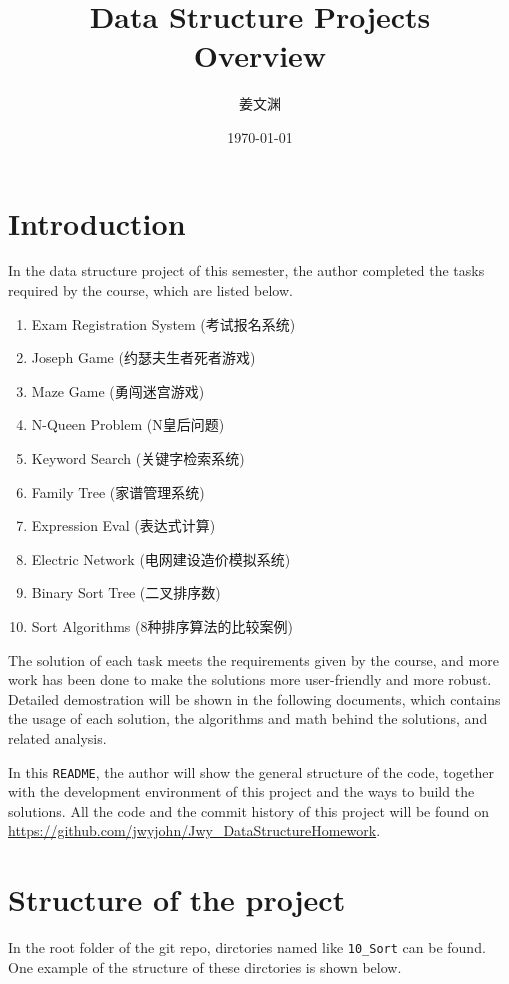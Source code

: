 \documentclass[cn,black,12pt,normal]{elegantnote}
\title{Data Structure Projects\\Overview}
\author{姜文渊}
\institute{School of Software Engineering, Tongji University}
\date{\today}
\begin{document}
\maketitle

\section{Introduction}

In the data structure project of this semester, the author completed the tasks required by the course, which are listed below.

\begin{enumerate}
    \item Exam Registration System (考试报名系统)
    \item Joseph Game (约瑟夫生者死者游戏)
    \item Maze Game (勇闯迷宫游戏)
    \item N-Queen Problem (N皇后问题)
    \item Keyword Search (关键字检索系统)
    \item Family Tree (家谱管理系统)
    \item Expression Eval (表达式计算)
    \item Electric Network (电网建设造价模拟系统)
    \item Binary Sort Tree (二叉排序数)
    \item Sort Algorithms (8种排序算法的比较案例)
\end{enumerate}

The solution of each task meets the requirements given by the course, and more work has been done to make the solutions more user-friendly and more robust. Detailed demostration will be shown in the following documents, which contains the usage of each solution, the algorithms and math behind the solutions, and related analysis.

In this \lstinline{README}, the author will show the general structure of the code, together with the development environment of this project and the ways to build the solutions. All the code and the commit history of this project will be found on \url{https://github.com/jwyjohn/Jwy_DataStructureHomework}.

\section{Structure of the project}

In the root folder of the git repo, dirctories named like \lstinline{10_Sort} can be found. One example of the structure of these dirctories is shown below.
\end{document}
